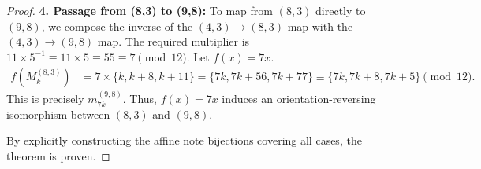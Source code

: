 \documentclass[10pt,a4paper]{amsart}
\begin{document}
\begin{proof}
\textbf{4. Passage from (8,3) to (9,8):}
To map from $(8,3)$ directly to $(9,8)$, we compose the inverse of the $(4,3)\to(8,3)$ map with the $(4,3)\to(9,8)$ map. The required multiplier is $11 \times 5^{-1} \equiv 11 \times 5 \equiv 55 \equiv 7 \pmod{12}$. Let $f(x) = 7x$.
\begin{align*}
    f(M_k^{(8,3)}) &= 7 \times \{k, k+8, k+11\} = \{7k, 7k+56, 7k+77\} \equiv \{7k, 7k+8, 7k+5\} \pmod{12}.
\end{align*}
This is precisely $m_{7k}^{(9,8)}$. Thus, $f(x)=7x$ induces an orientation-reversing isomorphism between $(8,3)$ and $(9,8)$.

By explicitly constructing the affine note bijections covering all cases, the theorem is proven.
\end{proof}
\end{document}
